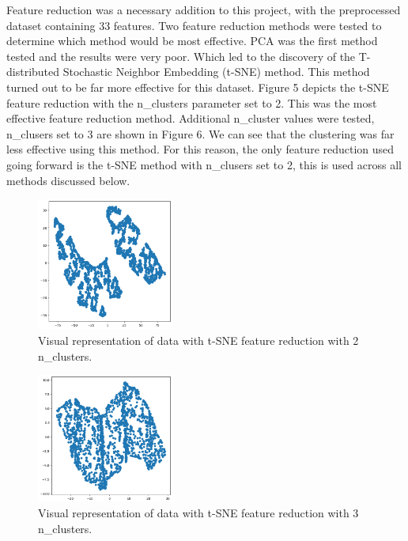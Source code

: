 \documentclass[twocolumn]{article}
\begin{document}
Feature reduction was a necessary addition to this project, with the preprocessed dataset containing 33 features. Two feature reduction methods were tested to determine which method would be most effective. PCA was the first method tested and the results were very poor. Which led to the discovery of the T-distributed Stochastic Neighbor Embedding (t-SNE) method. This method turned out to be far more effective for this dataset. Figure 5 depicts the t-SNE feature reduction with the n\_clusters parameter set to 2. This was the most effective feature reduction method. Additional n\_cluster values were tested, n\_clusers set to 3 are shown in Figure 6. We can see that the clustering was far less effective using this method. For this reason, the only feature reduction used going forward is the t-SNE method with n\_clusers set to 2, this is used across all methods discussed below.

\begin{figure}
    \centering
    \includegraphics[width=0.4\textwidth]{images/tsne_2.png}
    \caption{Visual representation of data with t-SNE feature reduction with 2 n\_clusters.}
\end{figure}



\begin{figure}
    \centering
    \includegraphics[width=0.4\textwidth]{images/tsne_3.png}
    \caption{Visual representation of data with t-SNE feature reduction with 3 n\_clusters.}
\end{figure}
\end{document}
